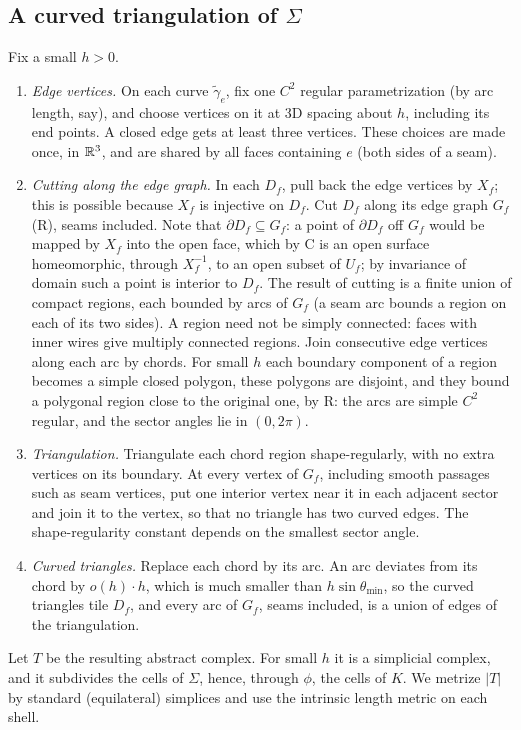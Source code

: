 \subsection{A curved triangulation of $\Sigma$}
Fix a small $h>0$.
\begin{enumerate}
\item \emph{Edge vertices.} On each curve $\tilde\gamma_e$, fix one $C^2$ regular parametrization (by arc length, say),
and choose vertices on it at 3D spacing about $h$, including its end points. A closed edge gets at least three
vertices. These choices are made once, in $\mathbb{R}^3$, and are shared by all faces containing $e$ (both sides of a seam).
\item \emph{Cutting along the edge graph.} In each $D_f$, pull back the edge vertices by $X_f$; this is possible because
$X_f$ is injective on $D_f$. Cut $D_f$ along its edge graph $G_f$ (R), seams included. Note that $\partial D_f\subseteq G_f$: a point of
$\partial D_f$ off $G_f$ would be mapped by $X_f$ into the open face, which by C is an open surface homeomorphic, through
$X_f^{-1}$, to an open subset of $U_f$; by invariance of domain such a point is interior to $D_f$. The result of cutting
is a finite union of compact regions, each bounded by arcs of $G_f$ (a seam arc bounds a region on each of its two
sides). A region need not be simply connected: faces with inner wires give multiply connected regions. Join consecutive
edge vertices along each arc by chords. For small $h$ each boundary component of a region becomes a simple closed
polygon, these polygons are disjoint, and they bound a polygonal region close to the original one, by R: the arcs are
simple $C^2$ regular, and the sector angles lie in $(0,2\pi)$.
\item \emph{Triangulation.} Triangulate each chord region shape-regularly, with no extra vertices on its boundary. At
every vertex of $G_f$, including smooth passages such as seam vertices, put one interior vertex near it in each adjacent
sector and join it to the vertex, so that no triangle has two curved edges. The shape-regularity constant depends on
the smallest sector angle.
\item \emph{Curved triangles.} Replace each chord by its arc. An arc deviates from its chord by $o(h)\cdot h$, which is
much smaller than $h\sin\theta_{\min}$, so the curved triangles tile $D_f$, and every arc of $G_f$, seams included, is a
union of edges of the triangulation.
\end{enumerate}
Let $T$ be the resulting abstract complex. For small $h$ it is a simplicial complex, and it subdivides the cells of
$\Sigma$, hence, through $\phi$, the cells of $K$. We metrize $|T|$ by standard (equilateral) simplices and use the intrinsic
length metric on each shell.


